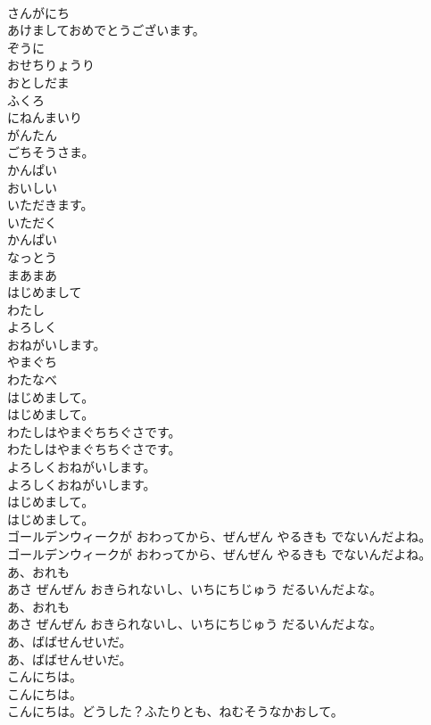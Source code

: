 \documentclass[8pt]{extreport}
\begin{document}
\begin{CJK}{UTF8}{min}
\\	さんがにち
\\	あけましておめでとうございます。
\\	ぞうに
\\	おせちりょうり
\\	おとしだま
\\	ふくろ
\\	にねんまいり
\\	がんたん
\\	ごちそうさま。
\\	かんぱい
\\	おいしい
\\	いただきます。
\\	いただく
\\	かんぱい
\\	なっとう
\\	まあまあ
\\	はじめまして
\\	わたし
\\	よろしく
\\	おねがいします。
\\	やまぐち
\\	わたなべ
\\	はじめまして。
\\	はじめまして。
\\	わたしはやまぐちちぐさです。
\\	わたしはやまぐちちぐさです。
\\	よろしくおねがいします。
\\	よろしくおねがいします。
\\	はじめまして。
\\	はじめまして。
\\	ゴールデンウィークが おわってから、ぜんぜん やるきも でないんだよね。
\\	ゴールデンウィークが おわってから、ぜんぜん やるきも でないんだよね。
\\	あ、おれも
\\	あさ ぜんぜん おきられないし、いちにちじゅう だるいんだよな。
\\	あ、おれも
\\	あさ ぜんぜん おきられないし、いちにちじゅう だるいんだよな。
\\	あ、ばばせんせいだ。
\\	あ、ばばせんせいだ。
\\	こんにちは。
\\	こんにちは。
\\	こんにちは。どうした？ふたりとも、ねむそうなかおして。

\end{CJK}
\end{document}
